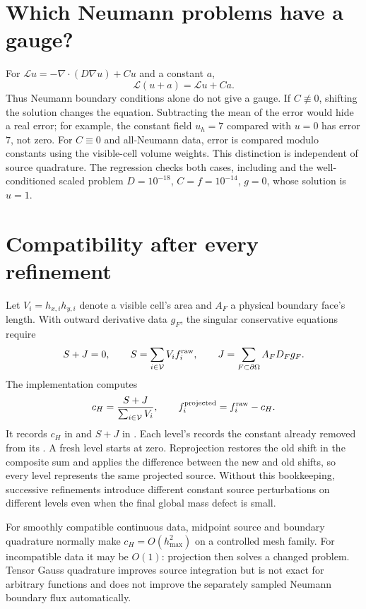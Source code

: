 \section{Which Neumann problems have a gauge?}
For $\mathcal L u=-\nabla\cdot(D\nabla u)+Cu$ and a constant $a$,
\[
  \mathcal L(u+a)=\mathcal L u+Ca.
\]
Thus Neumann boundary conditions alone do not give a gauge.  If
$C\not\equiv0$, shifting the solution changes the equation.  Subtracting
the mean of the error would hide a real error; for example, the constant
field $u_h=7$ compared with $u=0$ has error $7$, not zero.  For
$C\equiv0$ and all-Neumann data, error is compared modulo constants using
the visible-cell volume weights.  This distinction is independent of
source quadrature.  The regression  checks
both cases, including  and the well-conditioned scaled
problem $D=10^{-18}$, $C=f=10^{-14}$, $g=0$, whose solution is $u=1$.

\section{Compatibility after every refinement}
Let $V_i=h_{x,i}h_{y,i}$ denote a visible cell's area and $A_F$ a
physical boundary face's length.  With outward derivative data $g_F$,
the singular conservative equations require
\[
 S+J=0,\qquad S=\sum_{i\in\mathcal{V}}V_i f_i^{\rm raw},\qquad
 J=\sum_{F\subset\partial\Omega} A_F D_F g_F.
\]
The implementation computes
\[
 c_H=\frac{S+J}{\sum_{i\in\mathcal{V}}V_i},\qquad
 f_i^{\rm projected}=f_i^{\rm raw}-c_H.
\]
It records $c_H$ in  and $S+J$ in
.  Each level's
 records the constant already removed from its
.  A fresh level starts at zero.  Reprojection restores the
old shift in the composite sum and applies the difference between the
new and old shifts, so every level represents the same projected source.
Without this bookkeeping, successive refinements introduce different
constant source perturbations on different levels even when the final
global mass defect is small.

For smoothly compatible continuous data, midpoint source and boundary
quadrature normally make $c_H=O(h_{\max}^2)$ on a controlled mesh family.
For incompatible data it may be $O(1)$: projection then solves a changed
problem.  Tensor Gauss quadrature improves source integration but is not
exact for arbitrary functions and does not improve the separately
sampled Neumann boundary flux automatically.

